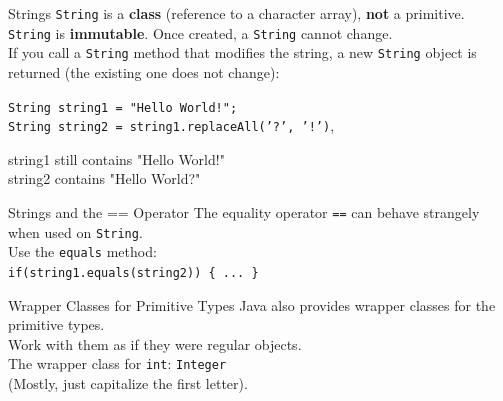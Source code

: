 \documentclass[aspectratio=169]{beamer}
\begin{document}
\begin{frame}{Strings}
\texttt{String} is a \textbf{class} (reference to a character array), \textbf{not} a primitive. \\
\vspace{0.5em}
\texttt{String} is \textbf{immutable}. Once created, a \texttt{String} cannot change. \\
\vspace{0.5em}
If you call a \texttt{String} method that modifies the string, a new \texttt{String} object is returned (the existing one does not change):\\
\vspace{1em}

\texttt{String string1 = "Hello World!";} \\
\texttt{String string2 = string1.replaceAll('?', '!')}, \\
\vspace{1em}

string1 still contains "Hello World!" \\
string2 contains "Hello World?"

\end{frame}

\begin{frame}{Strings and the == Operator}
The equality operator \texttt{==} can behave strangely when used on \texttt{String}. \\
\vspace{1em}
Use the \texttt{equals} method: \\
\texttt{if(string1.equals(string2)) \{ ... \} }
\end{frame}



\begin{frame}{Wrapper Classes for Primitive Types}
Java also provides wrapper classes for the primitive types. \\
\vspace{0.5em}
Work with them as if they were regular objects. \\
\vspace{0.5em}
The wrapper class for \texttt{int}: \texttt{Integer} \\ 
\vspace{0.5em}
(Mostly, just capitalize the first letter). \\
\end{frame}
\end{document}
